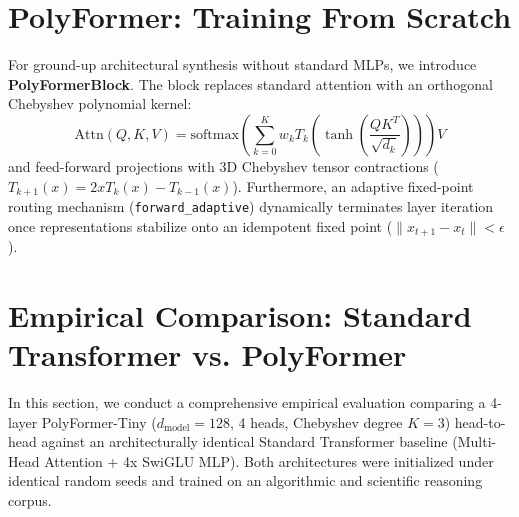 \documentclass[journal,lettersize]{IEEEtran}
\begin{document}
\section{PolyFormer: Training From Scratch}
For ground-up architectural synthesis without standard MLPs, we introduce \textbf{PolyFormerBlock}. The block replaces standard attention with an orthogonal Chebyshev polynomial kernel:
\begin{equation}
\text{Attn}(Q, K, V) = \text{softmax}\left( \sum_{k=0}^K w_k T_k\left(\tanh\left(\frac{QK^T}{\sqrt{d_k}}\right)\right) \right) V
\end{equation}
and feed-forward projections with 3D Chebyshev tensor contractions ($T_{k+1}(x) = 2x T_k(x) - T_{k-1}(x)$). Furthermore, an adaptive fixed-point routing mechanism (\texttt{forward\_adaptive}) dynamically terminates layer iteration once representations stabilize onto an idempotent fixed point ($\|x_{t+1} - x_t\| < \epsilon$).

\section{Empirical Comparison: Standard Transformer vs. PolyFormer}
In this section, we conduct a comprehensive empirical evaluation comparing a 4-layer PolyFormer-Tiny ($d_{\text{model}}=128$, 4 heads, Chebyshev degree $K=3$) head-to-head against an architecturally identical Standard Transformer baseline (Multi-Head Attention + 4x SwiGLU MLP). Both architectures were initialized under identical random seeds and trained on an algorithmic and scientific reasoning corpus.

\begin{table}[h]
\centering
\caption{Comprehensive Architectural \& Inference Comparison}
\label{tab:polyformer_comparison}
\end{table}
\end{document}
